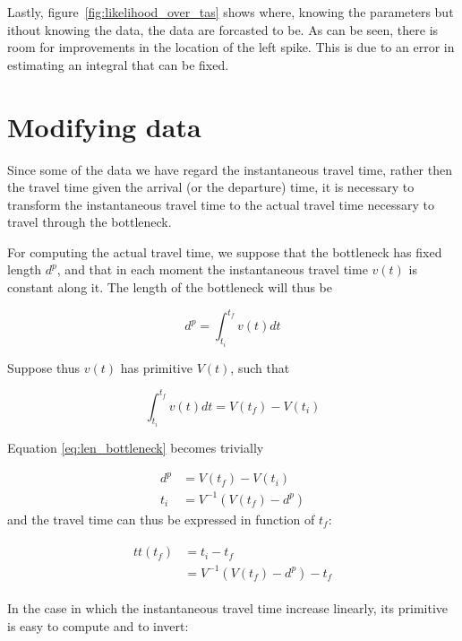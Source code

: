 \documentclass{article}
\begin{document}
Lastly, figure~\autoref{fig:likelihood_over_tas} shows where, knowing the parameters but ithout knowing the data, the data are forcasted to be.
As can be seen, there is room for improvements in the location of the left spike. This is due to an error in estimating an integral that can be fixed.

\section{Modifying data}

Since some of the data we have regard the instantaneous travel time,
rather then the travel time given the arrival (or the departure) time,
it is necessary to transform the instantaneous travel time to the actual travel time necessary to travel through the bottleneck.

For computing the actual travel time, we suppose that the bottleneck has fixed length \(d^p\),
and that in each moment the instantaneous travel time \(v(t)\) is constant along it.
The length of the bottleneck will thus be

\begin{equation}
  \label{eq:len_bottleneck}
  d^p = \int_{t_i}^{t_f}v(t) dt
\end{equation}

Suppose thus \(v(t)\) has primitive \(V(t)\), such that

\begin{equation}
  \label{eq:primitive}
  \int_{t_i}^{t_f}v(t) dt = V(t_f) - V(t_i)
\end{equation}

Equation \eqref{eq:len_bottleneck} becomes trivially

\begin{align*}
  d^p & = V(t_f) - V(t_i) \\
  t_i & = V^{-1}(V(t_f) - d^p)
\end{align*}
and the travel time can thus be expressed in function of \(t_f\):

\begin{align*}
  \begin{split}
    \label{eq:travel_time}
    tt(t_f) & = t_i - t_f \\
    & = V^{-1}(V(t_f) - d^p) - t_f
  \end{split}
\end{align*}

In the case in which the instantaneous travel time increase linearly, its primitive is easy to compute and to invert:
\end{document}
